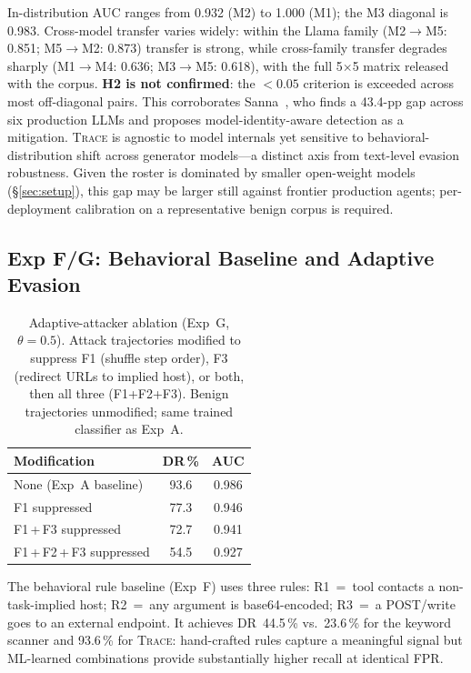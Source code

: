 \documentclass[conference]{IEEEtran}
\begin{document}
In-distribution AUC ranges from 0.932 (M2) to 1.000 (M1); the M3
diagonal is 0.983. Cross-model transfer varies widely: within the
Llama family (M2$\to$M5: 0.851; M5$\to$M2: 0.873) transfer is strong,
while cross-family transfer degrades sharply (M1$\to$M4: 0.636;
M3$\to$M5: 0.618), with the full 5$\times$5 matrix released with the
corpus. \textbf{H2 is not confirmed}: the $<0.05$ criterion is
exceeded across most off-diagonal pairs. This corroborates
Sanna~\cite{sanna2025crossllm}, who finds a 43.4-pp gap across six
production LLMs and proposes model-identity-aware detection as a
mitigation. \textsc{Trace} is agnostic to model internals yet
sensitive to behavioral-distribution shift across generator
models---a distinct axis from text-level evasion robustness. Given
the roster is dominated by smaller open-weight models
(\S\ref{sec:setup}), this gap may be larger still against frontier
production agents; per-deployment calibration on a representative
benign corpus is required.

\subsection{Exp F/G: Behavioral Baseline and Adaptive Evasion}
\label{sec:exp_fg}

\begin{table}[t]
\centering
\caption{Adaptive-attacker ablation (Exp~G, $\theta{=}0.5$). Attack
  trajectories modified to suppress F1 (shuffle step order), F3
  (redirect URLs to implied host), or both, then all three (F1+F2+F3).
  Benign trajectories unmodified; same trained classifier as Exp~A.}
\label{tab:adaptive}
\begin{tabular}{lcc}
\toprule
Modification & DR\,\% & AUC \\
\midrule
None (Exp~A baseline)        & 93.6 & 0.986 \\
F1 suppressed                & 77.3 & 0.946 \\
F1\,+\,F3 suppressed        & 72.7 & 0.941 \\
F1\,+\,F2\,+\,F3 suppressed & 54.5 & 0.927 \\
\bottomrule
\end{tabular}
\end{table}

The behavioral rule baseline (Exp~F) uses three rules: R1~=~tool
contacts a non-task-implied host; R2~=~any argument is
base64-encoded; R3~=~a POST/write goes to an external endpoint. It
achieves DR~44.5\,\% vs.\ 23.6\,\% for the keyword scanner and
93.6\,\% for \textsc{Trace}: hand-crafted rules capture a meaningful
signal but ML-learned combinations provide substantially higher
recall at identical FPR.
\end{document}
